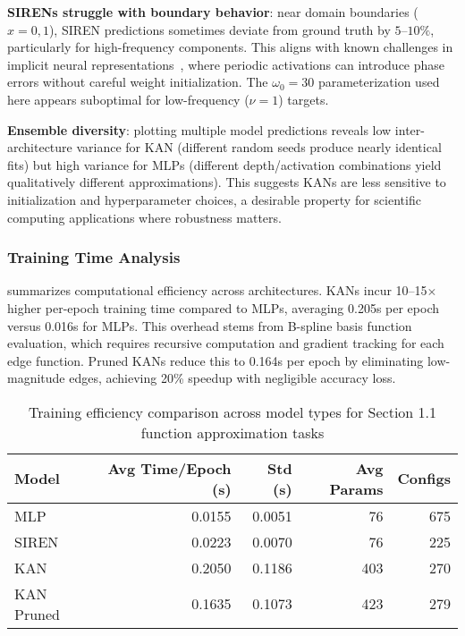 \documentclass[11pt,a4paper]{article}
\begin{document}
\textbf{SIRENs struggle with boundary behavior}: near domain boundaries ($x = 0, 1$), SIREN predictions sometimes deviate from ground truth by $5$--$10\%$, particularly for high-frequency components. This aligns with known challenges in implicit neural representations~\citep{sitzmann2020implicit}, where periodic activations can introduce phase errors without careful weight initialization. The $\omega_0 = 30$ parameterization used here appears suboptimal for low-frequency ($\nu = 1$) targets.

\textbf{Ensemble diversity}: plotting multiple model predictions reveals low inter-architecture variance for KAN (different random seeds produce nearly identical fits) but high variance for MLPs (different depth/activation combinations yield qualitatively different approximations). This suggests KANs are less sensitive to initialization and hyperparameter choices, a desirable property for scientific computing applications where robustness matters.

\subsubsection{Training Time Analysis}

 summarizes computational efficiency across architectures. KANs incur 10--15$\times$ higher per-epoch training time compared to MLPs, averaging 0.205s per epoch versus 0.016s for MLPs. This overhead stems from B-spline basis function evaluation, which requires recursive computation and gradient tracking for each edge function. Pruned KANs reduce this to 0.164s per epoch by eliminating low-magnitude edges, achieving 20\% speedup with negligible accuracy loss.

\begin{table}[htbp]
\centering
\caption{Training efficiency comparison across model types for Section 1.1 function approximation tasks}
\label{tab:training_time}
\begin{tabular}{lrrrr}
\toprule
\textbf{Model} & \textbf{Avg Time/Epoch (s)} & \textbf{Std (s)} & \textbf{Avg Params} & \textbf{Configs} \\
\midrule
MLP        & 0.0155 & 0.0051 & 76  & 675 \\
SIREN      & 0.0223 & 0.0070 & 76  & 225 \\
KAN        & 0.2050 & 0.1186 & 403 & 270 \\
KAN Pruned & 0.1635 & 0.1073 & 423 & 279 \\
\bottomrule
\end{tabular}
\end{table}
\end{document}
